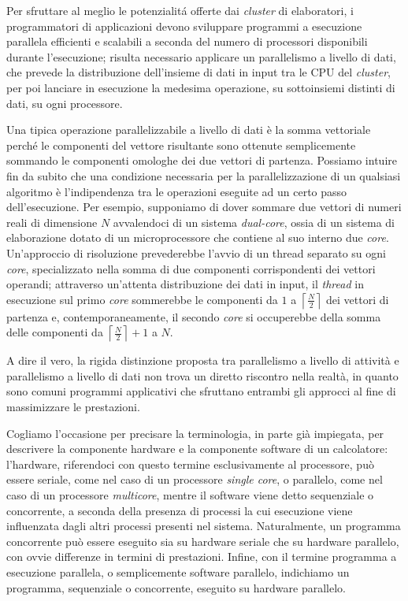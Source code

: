 Per sfruttare al meglio le potenzialit\'a offerte dai \textit{cluster} di elaboratori, i programmatori di applicazioni devono sviluppare programmi a esecuzione parallela efficienti e scalabili a seconda del numero di processori disponibili durante l'esecuzione; risulta necessario applicare un parallelismo a livello di dati, che prevede la distribuzione dell'insieme di dati in input tra le CPU del \textit{cluster}, per poi lanciare in esecuzione la medesima operazione, su sottoinsiemi distinti di dati, su ogni processore.

Una tipica operazione parallelizzabile a livello di dati \`e la somma vettoriale perch\'e le componenti del vettore risultante sono ottenute
semplicemente sommando le componenti omologhe dei due vettori di partenza. \newline
Possiamo intuire fin da subito che una condizione necessaria per la parallelizzazione di un qualsiasi algoritmo \`e l'indipendenza tra le operazioni eseguite ad un certo passo dell'esecuzione.\newline
Per esempio, supponiamo di dover sommare due vettori di numeri reali di dimensione $N$ avvalendoci di un sistema \textit{dual-core}, ossia di un sistema di elaborazione dotato di un microprocessore che contiene al suo interno
due \textit{core}.\newline
Un'approccio di risoluzione prevederebbe l'avvio di un thread separato su ogni \textit{core}, specializzato nella somma di due componenti corrispondenti dei vettori operandi; attraverso un'attenta distribuzione dei dati in input, il \textit{thread} in esecuzione sul primo \textit{core} sommerebbe le componenti da $1$ a $\left\lceil\frac{N}{2}\right\rceil$ dei vettori di partenza
e, contemporaneamente, il secondo \textit{core} si occuperebbe della somma delle componenti da $\left\lceil\frac{N}{2}\right\rceil + 1$ a $N$.

A dire il vero, la rigida distinzione proposta tra parallelismo a livello di attivit\`a e parallelismo a livello di dati non trova un diretto
riscontro nella realt\`a, in quanto sono comuni programmi applicativi che sfruttano entrambi gli approcci al fine di massimizzare le prestazioni.

Cogliamo l'occasione per precisare la terminologia, in parte gi\`a impiegata, per descrivere la componente hardware e la componente software di un calcolatore: l'hardware, riferendoci con questo termine esclusivamente al processore, pu\`o essere seriale, come nel caso di un processore \textit{single core}, o parallelo, come nel caso di un processore \textit{multicore}, mentre il software viene detto sequenziale o concorrente, a seconda della presenza di processi la cui esecuzione viene influenzata dagli altri processi presenti nel sistema.\newline
Naturalmente, un programma concorrente pu\`o essere eseguito sia su hardware seriale che su hardware parallelo, con ovvie differenze in termini di prestazioni.\newline
Infine, con il termine programma a esecuzione parallela, o semplicemente software parallelo, indichiamo un programma, sequenziale o concorrente, eseguito su hardware parallelo.